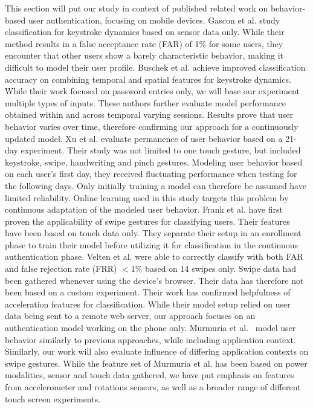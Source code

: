 \documentclass{llncs}
\begin{document}
This section will put our study in context of published related work on behavior-based user authentication, focusing on mobile devices.
Gascon et al. \cite{gascon2014continuous} study classification for keystroke dynamics based on sensor data only. While their method results in a false acceptance rate (FAR) of 1\% for some users, they encounter that other users show a barely characteristic behavior, making it difficult to model their user profile. Buschek et al. \cite{buschek2015} achieve improved classification accuracy on combining temporal and spatial features for keystroke dynamics. While their work focused on password entries only, we will base our experiment multiple types of inputs. These authors further evaluate model performance obtained within and across temporal varying sessions. Results prove that user behavior varies over time, therefore confirming our approach for a continuously updated model. Xu et al. \cite{xu2014towards} evaluate permanence of user behavior based on a 21-day experiment. Their study was not limited to one touch gesture, but included keystroke, swipe, handwriting and pinch gestures. Modeling user behavior based on each user’s first day, they received fluctuating performance when testing for the following days. Only
initially training a model can therefore be assumed have limited reliability. Online learning used in this study targets this problem by continuous adaptation of the modeled user behavior.
Frank et al. \cite{Frank13} have first proven the applicability of swipe gestures for classifying users. Their features have been based on touch data only. They separate their setup in an enrollment phase to train their model before utilizing it for classification in the continuous authentication phase. Velten et al. \cite{velten2015} were able to correctly classify with both FAR and false
rejection rate (FRR) $< 1\%$ based on 14 swipes only. Swipe data had been gathered whenever using the device’s browser. Their data has therefore not been based on a custom experiment. Their work has confirmed helpfulness of acceleration features for classification. While their model setup relied on user data being sent to a remote web server, our approach focuses on an authentication model working on the phone only. Murmuria et al.~\cite{murmuria2015continuous} model user behavior similarly to previous approaches, while including application context.
Similarly, our work will also evaluate influence of differing application contexts on swipe gestures. While the feature set of Murmuria et al. has been based on power modalities, sensor and touch data
gathered, we have put emphasis on features from accelerometer and rotations sensors, as well as a broader range of different touch screen experiments. 
\end{document}
